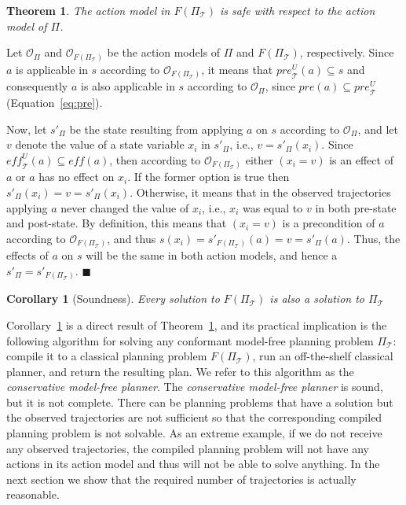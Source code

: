 \documentclass{article}
\newtheorem{corollary}{Corollary}
\newenvironment{proof}{\noindent{\bf Proof:~~}}{\qed}
\newcommand{\qed}{\hfill\ensuremath{\blacksquare}}
\newcommand{\cmfp}{conformant model-free planning}
\newcommand{\eff}{\textit{eff}}
\newcommand{\pre}{\textit{pre}}
\newtheorem{theorem}{Theorem}
\newcommand{\roni}[1]{[[Roni:#1]]}
\begin{document}
	\begin{theorem}
		The action model in $F(\Pi_\mathcal{T})$ 
		is safe with respect to the action model of $\Pi$. 
		\label{the:safeness}
	\end{theorem}
	\begin{proof}
		Let $\mathcal{O}_\Pi$ and $\mathcal{O}_{F(\Pi_\mathcal{T})}$ be the action models of $\Pi$ and $F(\Pi_\mathcal{T})$, respectively. 
		Since $a$ is applicable in $s$ according to $\mathcal{O}_{F(\Pi_\mathcal{T})}$, it means that $\pre_\mathcal{T}^U(a)\subseteq s$ and consequently  $a$ is also applicable in $s$ according to $\mathcal{O}_\Pi$, since $\pre(a)\subseteq \pre_\mathcal{T}^U$ (Equation~\ref{eq:pre}). 
		
		
		Now, let $s'_\Pi$ be the state resulting from applying $a$ on $s$ according to $\mathcal{O}_\Pi$, and let $v$ denote the value of a state variable $x_i$ in $s'_\Pi$, i.e., $v=s'_\Pi(x_i)$. 
		Since $\eff_\mathcal{T}^U(a)\subseteq \eff(a)$, 
		then according to $\mathcal{O}_{F(\Pi_\mathcal{T})}$ 
		either $(x_i=v)$ is an effect of $a$ 
		or $a$ has no effect on $x_i$. 
		If the former option is true then $s'_\Pi(x_i)=v=s'_\Pi(x_i)$. 
		Otherwise, it means that in the observed trajectories applying $a$ 
		never changed the value of $x_i$, i.e., $x_i$ was equal to $v$ in both pre-state and post-state. By definition, this means that $(x_i=v)$ is a precondition of $a$ 
		according to $\mathcal{O}_{F(\Pi_\mathcal{T})}$, 
		and thus $s(x_i)=s'_{F(\Pi_\mathcal{T})}(a)=v=s'_\Pi(a)$. 
		Thus, the effects of $a$ on $s$ will be the same in both action models, and hence a 
		$s'_\Pi=s'_{F(\Pi_\mathcal{T})}$. 
	\end{proof}
	\begin{corollary}[Soundness]
		Every solution to $F(\Pi_\mathcal{T})$ is also a solution to $\Pi_\mathcal{T}$
		\label{the:soundness}
	\end{corollary}
	Corollary~\ref{the:soundness} is a direct result of Theorem~\ref{the:safeness}, 
	and its practical implication is the following algorithm for solving 
	any \cmfp{} problem $\Pi_\mathcal{T}$: compile it to a classical planning problem 
	$F(\Pi_\mathcal{T})$, run an off-the-shelf classical planner, and return the resulting plan. 
	We refer to this algorithm as the {\em conservative model-free planner}. 	
	The {\em conservative model-free planner} is sound, but it is not complete. 
	There can be planning problems 
	that have a solution but the observed trajectories are not sufficient 
	so that the corresponding compiled planning problem is not solvable. 
	As an extreme example, if we do not receive any observed trajectories, 
	the compiled planning problem will not have any actions in its action model
	and thus will not be able to solve anything. 
	In the next section we show that the required number of trajectories is actually reasonable. 
	
\end{document}
